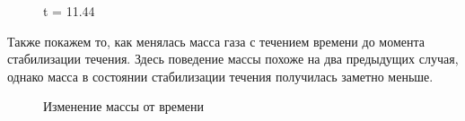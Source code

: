 \documentclass[specialist,subf,href,colorlinks=true,12pt
,times,mtpro,specialist
]{disser}
\begin{document}
\begin{figure}[H]
\begin{minipage}[h]{0.49\linewidth}
\end{minipage}
\hfill
\begin{minipage}[h]{0.49\linewidth}
\end{minipage}
\caption*{t = 11.44}
\end{figure}

Также покажем то, как менялась масса газа с течением времени до момента стабилизации течения. Здесь поведение массы похоже на два предыдущих случая, однако масса в состоянии стабилизации течения получилась заметно меньше.

\begin{figure}[H]
\caption*{Изменение массы от времени}
\end{figure}
\end{document}
